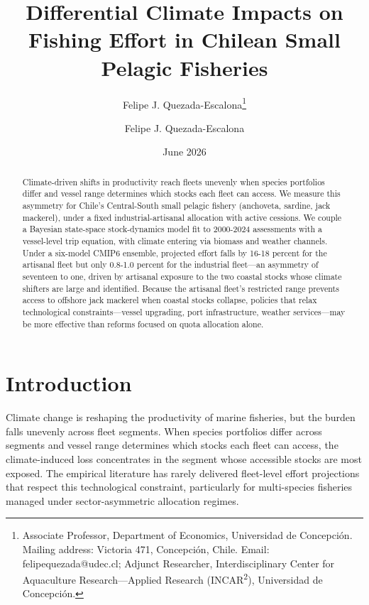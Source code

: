 \documentclass[
  11pt,
]{article}
\author{Felipe J. Quezada-Escalona\thanks{Associate Professor, Department of Economics, Universidad de Concepci\'on. Mailing address: Victoria 471, Concepci\'on, Chile. Email: felipequezada@udec.cl; Adjunct Researcher, Interdisciplinary Center for Aquaculture Research---Applied Research (INCAR\textsuperscript{2}), Universidad de Concepci\'on.}}
\affil{Universidad de Concepci\'on \vspace{-60pt}}
\title{Differential Climate Impacts on Fishing Effort in Chilean Small Pelagic Fisheries}
\author{Felipe J. Quezada-Escalona}
\date{June 2026}
\begin{document}
\maketitle
\begin{abstract}
Climate-driven shifts in productivity reach fleets unevenly when species portfolios differ and vessel range determines which stocks each fleet can access. We measure this asymmetry for Chile's Central-South small pelagic fishery (anchoveta, sardine, jack mackerel), under a fixed industrial-artisanal allocation with active cessions. We couple a Bayesian state-space stock-dynamics model fit to 2000-2024 assessments with a vessel-level trip equation, with climate entering via biomass and weather channels. Under a six-model CMIP6 ensemble, projected effort falls by 16-18 percent for the artisanal fleet but only 0.8-1.0 percent for the industrial fleet---an asymmetry of seventeen to one, driven by artisanal exposure to the two coastal stocks whose climate shifters are large and identified. Because the artisanal fleet's restricted range prevents access to offshore jack mackerel when coastal stocks collapse, policies that relax technological constraints---vessel upgrading, port infrastructure, weather services---may be more effective than reforms focused on quota allocation alone.
\end{abstract}

\par{}

\par{}

\doublespacing

\section{Introduction}\label{introduction}

Climate change is reshaping the productivity of marine fisheries, but the burden falls unevenly across fleet segments. When species portfolios differ across segments and vessel range determines which stocks each fleet can access, the climate-induced loss concentrates in the segment whose accessible stocks are most exposed. The empirical literature has rarely delivered fleet-level effort projections that respect this technological constraint, particularly for multi-species fisheries managed under sector-asymmetric allocation regimes.
\end{document}
